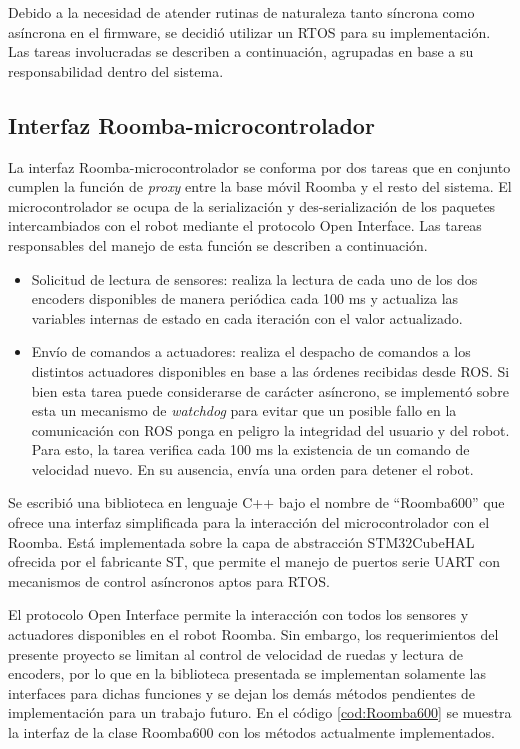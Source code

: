 Debido a la necesidad de atender rutinas de naturaleza tanto síncrona como asíncrona en el firmware, se decidió utilizar un RTOS para su implementación. Las tareas involucradas se describen a continuación, agrupadas en base a su responsabilidad dentro del sistema.

\subsection{Interfaz Roomba-microcontrolador}

La interfaz Roomba-microcontrolador se conforma por dos tareas que en conjunto cumplen la función de \textit{proxy} entre la base móvil Roomba y el resto del sistema. El microcontrolador se ocupa de la serialización y des-serialización de los paquetes intercambiados con el robot mediante el protocolo Open Interface. Las tareas responsables del manejo de esta función se describen a continuación.

\begin{itemize}
  \item Solicitud de lectura de sensores: realiza la lectura de cada uno de los dos encoders disponibles de manera periódica cada 100 ms y actualiza las variables internas de estado en cada iteración con el valor actualizado.
  \item Envío de comandos a actuadores: realiza el despacho de comandos a los distintos actuadores disponibles en base a las órdenes recibidas desde ROS. Si bien esta tarea puede considerarse de carácter asíncrono, se implementó sobre esta un mecanismo de \textit{watchdog} para evitar que un posible fallo en la comunicación con ROS ponga en peligro la integridad del usuario y del robot. Para esto, la tarea verifica cada 100 ms la existencia de un comando de velocidad nuevo. En su ausencia, envía una orden para detener el robot.
\end{itemize}

Se escribió una biblioteca en lenguaje C++ bajo el nombre de ``Roomba600'' que ofrece una interfaz simplificada para la interacción del microcontrolador con el Roomba. Está implementada sobre la capa de abstracción STM32CubeHAL ofrecida por el fabricante ST, que permite el manejo de puertos serie UART con mecanismos de control asíncronos aptos para RTOS.

El protocolo Open Interface permite la interacción con todos los sensores y actuadores disponibles en el robot Roomba. Sin embargo, los requerimientos del presente proyecto se limitan al control de velocidad de ruedas y lectura de encoders, por lo que en la biblioteca presentada se implementan solamente las interfaces para dichas funciones y se dejan los demás métodos pendientes de implementación para un trabajo futuro. En el código \ref{cod:Roomba600} se muestra la interfaz de la clase Roomba600 con los métodos actualmente implementados.



